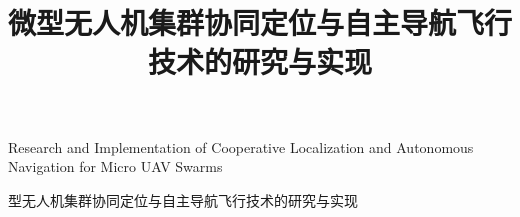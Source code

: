 \documentclass[algorithmlist,figurelist,tablelist,nomlist, nocolorlinks]{template/seumasterthesis}
\begin{document}
\studentid{}      %

\title
    {微型无人机集群协同定位与自主导航飞行技术的研究与实现}        %
    {}         %
    {Research and Implementation of Cooperative Localization and Autonomous Navigation for Micro UAV Swarms}  %

\spine
    {型无人机集群协同定位与自主导航飞行技术的研究与实现} 
    {}                                                               

\author
    {}                        %
    {}                  %

\advisor
    {}                %
    {}        %
    {}                     %
    
\coadvisor                 %
    {}                  %
    {}             %
    {}                 %
\degreetype                        %
    {}
    {}
\major{}                 %
\authorizedate{}                  %
\committeechair{}               %
\reviewer{}{}            %
\department                        %
    {}
    {}
\end{document}
